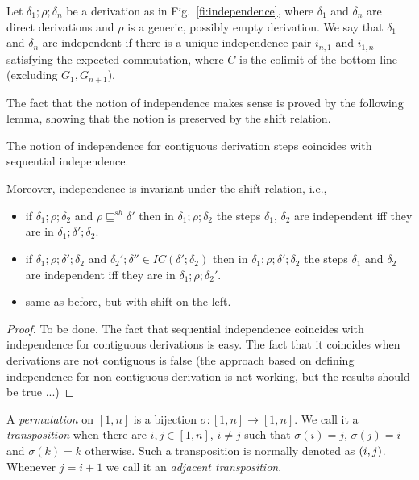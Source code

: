 \documentclass{llncs}
\newcommand{\interval}[2][1]{\ensuremath{[{#1},{#2}]}}
\newcommand{\perm}{\sigma}
\newcommand{\shiftpre}[1][]{\ensuremath{\mathrel{{\sqsubseteq}^{\mathit{sh}}_{#1}}}}
\newcommand{\IC}[1]{\ensuremath{\mathit{IC}({#1})}}
\begin{document}
\begin{definition}[independence]
  Let $\delta_1;\rho;\delta_n$ be a derivation as in
  Fig.~\ref{fi:independence}, where $\delta_1$ and $\delta_n$ are
  direct derivations and $\rho$ is a generic, possibly empty
  derivation. We say that $\delta_1$ and $\delta_n$ are independent if
  there is a unique independence pair $i_{n,1}$ and $i_{1,n}$
  satisfying the expected commutation, where $C$ is the colimit of the
  bottom line (excluding $G_1, G_{n+1}$).
\end{definition}

The fact that the notion of independence makes sense is proved by the following lemma, showing that the notion is preserved by the shift relation.

\begin{lemma}
  \label{le:seq-ind-glob1}
  The notion of independence for contiguous derivation steps
  coincides with sequential independence.

  Moreover, independence is invariant under the shift-relation, i.e.,
  \begin{itemize}
    
  \item if $\delta_1;\rho;\delta_2$ and $\rho \shiftpre \delta'$ then
    in $\delta_1;\rho;\delta_2$ the steps $\delta_1$, $\delta_2$ are
    independent iff they are in $\delta_1;\delta';\delta_2$.

  \item if $\delta_1;\rho;\delta';\delta_2$ and
    $\delta_2'; \delta'' \in \IC{\delta';\delta_2}$ then in
    $\delta_1;\rho;\delta';\delta_2$ the steps $\delta_1$ and $\delta_2$ are
    independent iff they are in $\delta_1;\rho;\delta_2'$.

  \item same as before, but with shift on the left.
  \end{itemize}
\end{lemma}

\begin{proof}
  To be done. The fact that sequential independence coincides with
  independence for contiguous derivations is easy. The fact that it coincides when derivations are not contiguous is false (the approach based on defining independence for non-contiguous derivation is not working, but the results should be true ...)
\end{proof}


A \emph{permutation} on $\interval{n}$ is a bijection
$\perm : \interval{n} \to \interval{n}$. We call it a
\emph{transposition} when there are $i, j \in \interval{n}$,
$i \neq j$ such that $\sigma(i)=j$, $\sigma(j) = i$ and
$\sigma(k) = k$ otherwise. Such a transposition is normally denoted as
$\transp{i}[j]$. Whenever $j = i+1$ we call it an \emph{adjacent
  transposition}.
\end{document}
